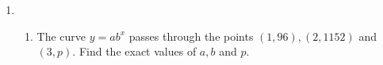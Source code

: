 \documentclass{report}
\newcommand{\sol}{\vspace{0.2cm}\textbf{Solution:}\vspace{0.2cm}}
\begin{document}
\begin{multicols*}{2}
\begin{enumerate}[leftmargin=*]
\begin{enumerate}
                        \sol{}
                        \begin{align*}
                            4^x - 9 \cdot 2^x + 8 & = 0               \\
                            u^2 - 9u + 8          & = 0               \\
                            (u - 8)(u - 1)        & = 0               \\
                            u                     & = 8 \text{ or } 1 \\
                            2^x                   & = 8 \text{ or } 1 \\
                            x                     & = 3 \text{ or } 0
                        \end{align*}

                  \item Sketch the curve $y=e^{2 x-1}$ and calculate, correct to two decimal places,
                        the gradient of the curve at the point where it meets the $y$-axis.

                        \sol{}

                        Lazy to draw the graph. :P
              \end{enumerate}

        \item \begin{enumerate}
                  \item The curve $y=a b^x$ passes through the points $(1,96),(2,1152)$ and $(3, p)$.
                        Find the exact values of $a, b$ and $p$.


\end{enumerate}
\end{enumerate}
\end{multicols*}
\end{document}

